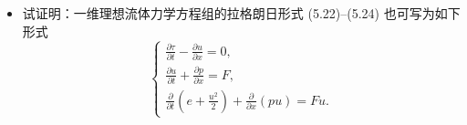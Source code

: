 \begin{itemize}
    \begin{proof}
    $$
    \begin{cases}
    \nabla\cdot\boldsymbol{v}=0,\\[1mm]
    \displaystyle
    \frac{\partial\boldsymbol{v}}{\partial t}
    -\mu\Delta\boldsymbol{v}
    +(\boldsymbol{v}\cdot\nabla)\boldsymbol{v}
    +\frac{1}{\rho}\nabla p=0.
    \end{cases}
    $$
    $$
    \begin{aligned}
    \frac{1}{2}\frac{\mathrm d}{\mathrm dt}
    \int_\Omega|\boldsymbol{v}|^2\,\mathrm dV
    &=\int_\Omega\boldsymbol{v}\cdot
    \frac{\partial\boldsymbol{v}}{\partial t}\,\mathrm dV\\
    &=\int_\Omega\left(
    \mu\boldsymbol{v}\cdot\Delta\boldsymbol{v}
    -\boldsymbol{v}\cdot
    ((\boldsymbol{v}\cdot\nabla)\boldsymbol{v})
    -\frac{1}{\rho}\boldsymbol{v}\cdot\nabla p
    \right)\mathrm dV\\
    &=\int_\Omega\left(
    \mu v_i\frac{\partial^2v_i}{\partial x_j\partial x_j}
    -\frac{1}{2}v_j\frac{\partial(v_iv_i)}{\partial x_j}
    -\frac{1}{\rho}v_j\frac{\partial p}{\partial x_j}
    \right)\mathrm dV\\
    &=-\int_\Omega\mu
    \frac{\partial v_i}{\partial x_j}
    \frac{\partial v_i}{\partial x_j}\,\mathrm dV
    +\frac{1}{2}\int_\Omega v_iv_i
    \frac{\partial v_j}{\partial x_j}\,\mathrm dV
    +\int_\Omega\frac{p}{\rho}
    \frac{\partial v_j}{\partial x_j}\,\mathrm dV\\
    &=-\int_\Omega\mu
    \left(\frac{\partial v_i}{\partial x_j}\right)^2
    \mathrm dV\leq0.
    \end{aligned}
    $$
    其中倒数第二个等号使用分部积分，最后一个等号用到不可压缩性质。
    \end{proof}

    \item[10.]试证明：一维理想流体力学方程组的拉格朗日形式 (5.22)--(5.24) 也可写为如下形式
    $$
    \begin{cases}
    \displaystyle\frac{\partial\tau}{\partial t}
    -\frac{\partial u}{\partial x}=0,\\[2mm]
    \displaystyle\frac{\partial u}{\partial t}
    +\frac{\partial p}{\partial x}=F,\\[2mm]
    \displaystyle\frac{\partial}{\partial t}
    \left(e+\frac{u^2}{2}\right)
    +\frac{\partial}{\partial x}(pu)=Fu.
    \end{cases}
    $$


\end{itemize}
